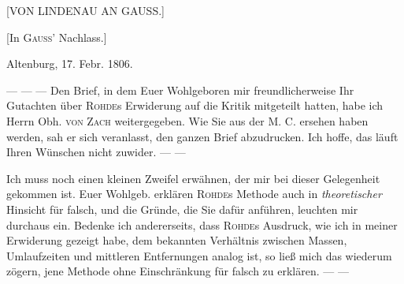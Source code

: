 \clearpage
\hypertarget{native-491-lindenau}{}
\label{native-491-lindenau}
\begin{center}
[VON LINDENAU AN GAUSS.]

[In \textsc{Gauss}’ Nachlass.]
\end{center}

\begin{flushright}Altenburg, 17. Febr. 1806.\end{flushright}

--- --- --- Den Brief, in dem Euer Wohlgeboren mir freundlicherweise Ihr Gutachten über \textsc{Rohde}s Erwiderung auf die Kritik mitgeteilt hatten, habe ich Herrn Obh. \textsc{von Zach} weitergegeben. Wie Sie aus der M. C. ersehen haben werden, sah er sich veranlasst, den ganzen Brief abzudrucken. Ich hoffe, das läuft Ihren Wünschen nicht zuwider. --- ---

Ich muss noch einen kleinen Zweifel erwähnen, der mir bei dieser Gelegenheit gekommen ist. Euer Wohlgeb. erklären \textsc{Rohde}s Methode auch in \emph{theoretischer} Hinsicht für falsch, und die Gründe, die Sie dafür anführen, leuchten mir durchaus ein. Bedenke ich andererseits, dass \textsc{Rohde}s Ausdruck, wie ich in meiner Erwiderung gezeigt habe, dem bekannten Verhältnis zwischen Massen, Umlaufzeiten und mittleren Entfernungen analog ist, so ließ mich das wiederum zögern, jene Methode ohne Einschränkung für falsch zu erklären. --- ---

